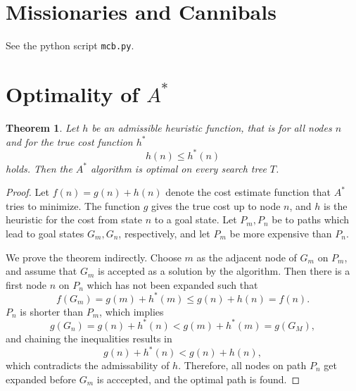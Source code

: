 \documentclass[11pt,a4paper]{scrartcl}
\newtheorem*{theorem}{Theorem}
\begin{document}
\section{Missionaries and Cannibals}

See the python script \verb$mcb.py$. 

\section{Optimality of $A^*$}

\begin{theorem}
Let $h$ be an admissible heuristic function, that is for all nodes $n$ and for the 
true cost function $h^*$ 
\begin{equation*}
h(n)\leq h^*(n)
\end{equation*}
holds. Then the $A^*$ algorithm is optimal on every search tree $T$.
\end{theorem}
\begin{proof}
Let $f(n) = g(n) + h(n)$ denote the cost estimate function that $A^*$ tries to 
minimize. The function $g$ gives the true cost up to node $n$, and $h$ is the 
heuristic for the cost from state $n$ to a goal state. Let $P_m, P_n$ be to paths which lead to goal states 
$G_m, G_n$, respectively, and let $P_m$ be more expensive than $P_n$.

We prove the theorem indirectly. Choose $m$ as the adjacent node of $G_m$ on $P_m$, and assume that $G_m$ is accepted 
as a solution by the algorithm. Then there is a first node $n$ on $P_n$ which has not been expanded such that
\begin{equation*}
f(G_m) = g(m) + h^*(m) \leq g(n) + h(n) = f(n) .
\end{equation*}
$P_n$ is shorter than $P_m$, which implies
\begin{equation*}
g(G_n) = g(n) + h^*(n) < g(m) + h^*(m) = g(G_M),
\end{equation*}
and chaining the inequalities results in 
\begin{equation*}
g(n) + h^*(n) < g(n) + h(n),
\end{equation*}
which contradicts the admissability of $h$. Therefore, all nodes on path $P_n$ get expanded before $G_m$ is acccepted, 
and the optimal path is found.
\end{proof}
%
%
\end{document}

